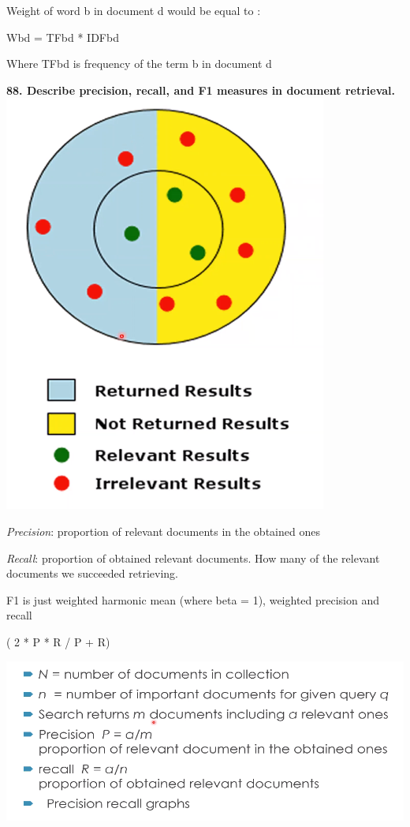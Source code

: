 Weight of word b in document d would be equal to :

Wbd = TFbd * IDFbd

Where TFbd is frequency of the term b in document d

\textbf{88. Describe precision, recall, and F1 measures in document
retrieval.}\includegraphics[width=\columnwidth]{media/image23.png}

\textit{Precision}: proportion of relevant documents in the obtained
ones

\textit{Recall}: proportion of obtained relevant documents. How many
of the relevant documents we succeeded retrieving.

F1 is just weighted harmonic mean (where beta = 1), weighted precision
and recall

( 2 * P * R / P + R)

\includegraphics[width=\columnwidth]{media/image15.png}


